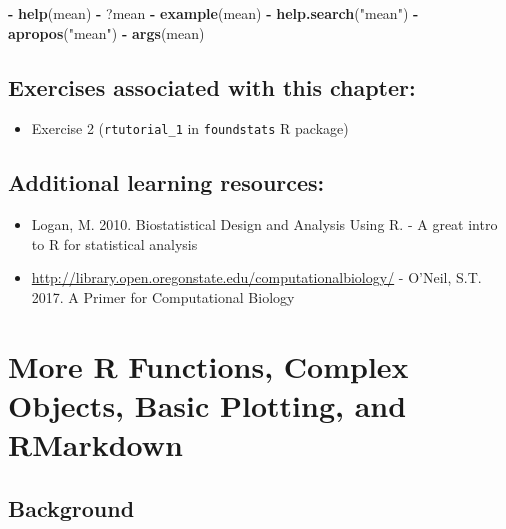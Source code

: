 \documentclass[]{book}
\newenvironment{Shaded}{\begin{snugshade}}{\end{snugshade}}
\newcommand{\KeywordTok}[1]{\textcolor[rgb]{0.13,0.29,0.53}{\textbf{#1}}}
\newcommand{\NormalTok}[1]{#1}
\newcommand{\OperatorTok}[1]{\textcolor[rgb]{0.81,0.36,0.00}{\textbf{#1}}}
\newcommand{\StringTok}[1]{\textcolor[rgb]{0.31,0.60,0.02}{#1}}
\providecommand{\tightlist}{%
  \setlength{\itemsep}{0pt}\setlength{\parskip}{0pt}}
\begin{document}
\begin{Shaded}
\begin{Highlighting}[]
\OperatorTok{-}\StringTok{ }\KeywordTok{help}\NormalTok{(mean)}
\OperatorTok{-}\StringTok{ }\NormalTok{?mean}
\OperatorTok{-}\StringTok{ }\KeywordTok{example}\NormalTok{(mean)}
\OperatorTok{-}\StringTok{ }\KeywordTok{help.search}\NormalTok{(}\StringTok{"mean"}\NormalTok{)}
\OperatorTok{-}\StringTok{ }\KeywordTok{apropos}\NormalTok{(}\StringTok{"mean"}\NormalTok{)}
\OperatorTok{-}\StringTok{ }\KeywordTok{args}\NormalTok{(mean)}
\end{Highlighting}
\end{Shaded}

\hypertarget{exercises-associated-with-this-chapter-1}{%
\section{Exercises associated with this chapter:}\label{exercises-associated-with-this-chapter-1}}

\begin{itemize}
\tightlist
\item
  Exercise 2 (\texttt{rtutorial\_1} in \texttt{foundstats} R package)
\end{itemize}

\hypertarget{additional-learning-resources-1}{%
\section{Additional learning resources:}\label{additional-learning-resources-1}}

\begin{itemize}
\item
  Logan, M. 2010. Biostatistical Design and Analysis Using R. - A great intro to R for statistical analysis
\item
  \url{http://library.open.oregonstate.edu/computationalbiology/} - O'Neil, S.T. 2017. A Primer for Computational Biology
\end{itemize}

\hypertarget{more-r-functions-complex-objects-basic-plotting-and-rmarkdown}{%
\chapter{More R Functions, Complex Objects, Basic Plotting, and RMarkdown}\label{more-r-functions-complex-objects-basic-plotting-and-rmarkdown}}

\hypertarget{background-1}{%
\section{Background}\label{background-1}}
\end{document}
